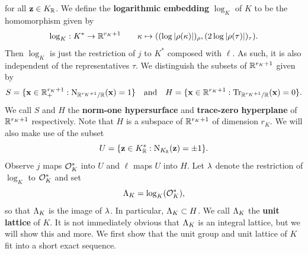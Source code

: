    for all \(\mathbf{z} \in K_{\mathbb{R}}\). We define the \textbf{logarithmic embedding} \(\log_{K}\) of \(K\) to be the homomorphism given by
    \[
      \log_{K}:K^{\ast} \to \mathbb{R}^{r_{K}+1} \qquad \kappa \mapsto ((\log|\rho(\kappa)|)_{\rho},(2\log|\rho(\tau)|)_{\tau}).
    \]
    Then \(\log_{K}\) is just the restriction of \(j\) to \(K^{\ast}\) composed with \(\ell\). As such, it is also independent of the representatives \(\tau\). We distinguish the subsets of \(\mathbb{R}^{r_{K}+1}\) given by
    \[
      S = \{\mathbf{x} \in  \mathbb{R}_{+}^{r_{K}+1}:\operatorname{\mathrm{N}}_{\mathbb{R}^{r_{K}+1}/\mathbb{R}}(\mathbf{x}) = 1\} \quad \text{and} \quad H = \{\mathbf{x} \in \mathbb{R}^{r_{K}+1}:\operatorname{\mathrm{Tr}}_{\mathbb{R}^{r_{K}+1}/\mathbb{R}}(\mathbf{x}) = 0\}.
    \]
    We call \(S\) and \(H\) the \textbf{norm-one hypersurface} and \textbf{trace-zero hyperplane} of \(\mathbb{R}^{r_{K}+1}\) respectively. Note that \(H\) is a subspace of \(\mathbb{R}^{r_{K}+1}\) of dimension \(r_{K}\). We will also make use of the subset
    \[
      U = \{\mathbf{z} \in K_{\mathbb{R}}^{\ast}:\operatorname{\mathrm{N}}_{K_{\mathbb{R}}}(\mathbf{z}) = \pm 1\}.
    \]
    Observe \(j\) maps \(\mathcal{O}_{K}^{\ast}\) into \(U\) and \(\ell\) maps \(U\) into \(H\). Let \(\lambda\) denote the restriction of \(\log_{K}\) to \(\mathcal{O}_{K}^{\ast}\) and set
    \[
      \Lambda_{K} = \log_{K}(\mathcal{O}_{K}^{\ast}),
    \]
    so that \(\Lambda_{K}\) is the image of \(\lambda\). In particular, \(\Lambda_{K} \subset H\). We call \(\Lambda_{K}\) the \textbf{unit lattice} of \(K\). It is not immediately obvious that \(\Lambda_{K}\) is an integral lattice, but we will show this and more. We first show that the unit group and unit lattice of \(K\) fit into a short exact sequence.

